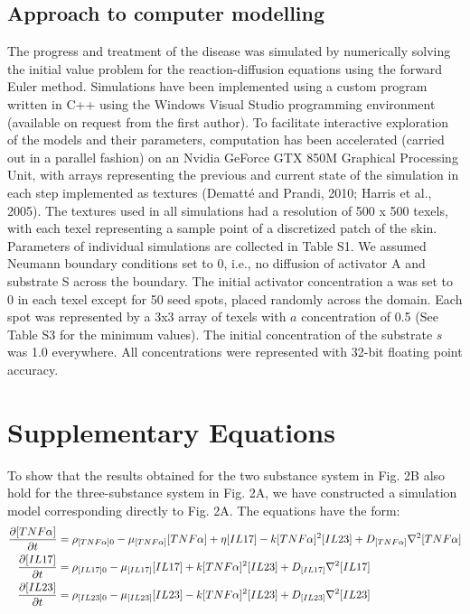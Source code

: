 \subsection{Approach to computer modelling}
The progress and treatment of the disease was simulated by numerically solving the initial value problem for the reaction-diffusion equations using the forward Euler method. Simulations have been implemented using a custom program written in C++ using the Windows Visual Studio programming environment (available on request from the first author). To facilitate interactive exploration of the models and their parameters, computation has been accelerated (carried out in a parallel fashion) on an Nvidia GeForce GTX 850M Graphical Processing Unit, with arrays representing the previous and current state of the simulation in each step implemented as textures (Dematté and Prandi, 2010; Harris et al., 2005). The textures used in all simulations had a resolution of 500 x 500 texels, with each texel representing a sample point of a discretized patch of the skin. Parameters of individual simulations are collected in Table S1. We assumed Neumann boundary conditions set to 0, i.e., no diffusion of activator A and substrate S across the boundary. The initial activator concentration a was set to 0 in each texel except for 50 seed spots, placed randomly across the domain.  Each spot was represented by a 3x3 array of texels with $a$ concentration of 0.5 (See Table S3 for the minimum values). The initial concentration of the substrate $s$ was 1.0 everywhere.  All concentrations were represented with 32-bit floating point accuracy. 

\section{Supplementary Equations}
To show that the results obtained for the two substance system in Fig. 2B also hold for the three-substance system in Fig. 2A, we have constructed a simulation model corresponding directly to Fig. 2A. The equations have the form: 
\begin{equation}
	\begin{aligned}
		\frac{\partial[TNF\alpha]}{\partial t}&=\rho_{[TNF\alpha]0}-\mu_{[TNF\alpha]}[TNF\alpha]+\eta[IL17]-k[TNF\alpha]^2[IL23]+D_{[TNF\alpha]}\nabla^2[TNF\alpha]\\
		\frac{\partial[IL17]}{\partial t}     &=\rho_{[IL17]0}     -\mu_{[IL17]}[IL17]                     +k[TNF\alpha]^2[IL23]+D_{[IL17]}\nabla^2[IL17]\\
		\frac{\partial[IL23]}{\partial t}     &=\rho_{[IL23]0}     -\mu_{[IL23]}[IL23]                     -k[TNF\alpha]^2[IL23]+D_{[IL23]}\nabla^2[IL23]
	\end{aligned}
\end{equation}

